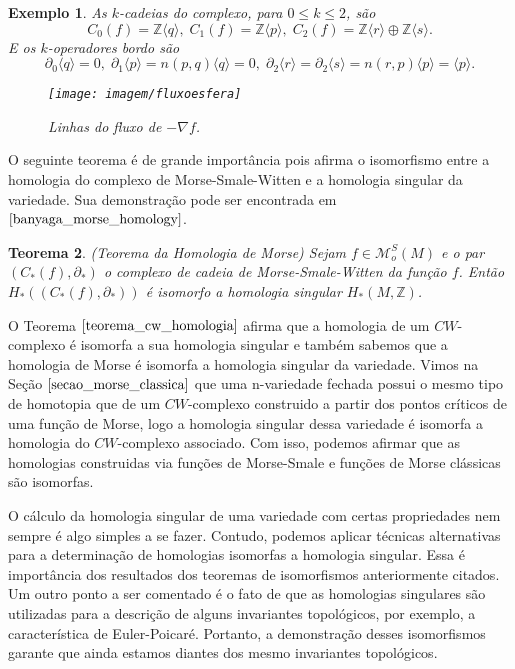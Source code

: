 \documentclass[12pt]{book}
\newtheorem{teorema}{Teorema}[section]
\newtheorem{exemplo}[teorema]{Exemplo}
\newcommand{\bordo}[1]{\partial_{#1}}
\newcommand{\funcoesmorsesmale}[1]{\mathcal{M}^{S}_{o}(#1)}
\newcommand{\gerador}[1]{\langle #1\rangle}
\newcommand{\gradiente}{\nabla f}
\newcommand{\inteiros}{\mathbb{Z}}
\begin{document}
\begin{exemplo}
		As $k$-cadeias do complexo, para $0\leq k\leq 2$, são
		$$
		C_{0}(f) = \inteiros\gerador{q},\; C_{1}(f) = \inteiros\gerador{p},\; C_{2}(f) = \inteiros\gerador{r}\oplus\inteiros\gerador{s}.
		$$
		E os $k$-operadores bordo são
		$$
		\bordo{0}\gerador{q} =0,\; \bordo{1}\gerador{p}=n(p,q)\gerador{q} = 0,\; \bordo{2}\gerador{r}=\bordo{2}\gerador{s} = n(r,p)\gerador{p} = \gerador{p}.
		$$
		
		\begin{figure}
			\centering
			\texttt{[image: imagem/fluxoesfera]}
			\caption{Linhas do fluxo de $-\gradiente$.}
			\label{figura_fluxo_morse_smale}
		\end{figure}
	\end{exemplo}

	
	O seguinte teorema é de grande importância pois afirma o isomorfismo entre a homologia do complexo de Morse-Smale-Witten e a homologia singular da variedade. Sua demonstração pode ser encontrada em $\cite{banyaga_morse_homology}$.
	
	\begin{teorema}
		(Teorema da Homologia de Morse) Sejam $f \in \funcoesmorsesmale{M}$ e o par $(C_{*}(f), \partial_{*})$ o complexo de cadeia de Morse-Smale-Witten da função $f$. Então $H_{*}((C_{*}(f), \partial_{*})) $ é isomorfo a homologia singular $ H_{*}(M, \inteiros)$.
	\end{teorema}
	
	O Teorema $\ref{teorema_cw_homologia}$ afirma que a homologia de um $CW$-complexo é isomorfa a sua homologia singular e também sabemos que a homologia de Morse é isomorfa a homologia singular da variedade. Vimos na Seção $\ref{secao_morse_classica}$ que uma n-variedade fechada possui o mesmo tipo de homotopia que de um $CW$-complexo construido a partir dos pontos críticos de uma função de Morse, logo a homologia singular dessa variedade é isomorfa a homologia do $CW$-complexo associado. Com isso, podemos afirmar que as homologias construidas via funções de Morse-Smale e funções de Morse clássicas são isomorfas.
	
	O cálculo da homologia singular de uma variedade com certas propriedades nem sempre é algo simples a se fazer. Contudo, podemos aplicar técnicas alternativas para a determinação de homologias isomorfas a homologia singular. Essa é importância dos resultados dos teoremas de isomorfismos anteriormente citados. Um outro ponto a ser comentado é o fato de que as homologias singulares são utilizadas para a descrição de alguns invariantes topológicos, por exemplo, a característica de Euler-Poicaré. Portanto, a demonstração desses isomorfismos garante que ainda estamos diantes dos mesmo invariantes topológicos.
	
\end{document}
